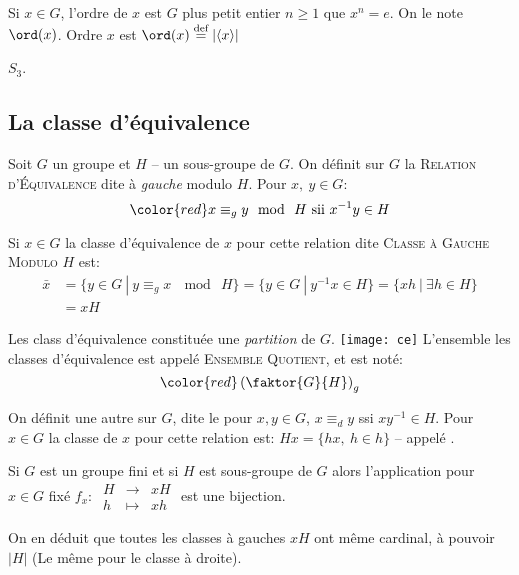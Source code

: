 Si  $x\in G$, l'ordre de $x$ est $G$ plus petit entier $n\geq 1$ que $x^n = e$. On le note $\ord(x)$. Ordre $x$ est $\ord(x)\overset{\text{def}}{=}|\langle x\rangle|$

\begin{exercise}
	$S_3$.
\end{exercise}

\subsection{La classe d'équivalence} 

\begin{definition}
	Soit $G$ un groupe et $H$ -- un sous-groupe de $G$. On définit sur $G$ la \textsc{Relation d'Équivalence} dite à \emph{gauche} modulo $H$. Pour $x,\ y\in G$: 
	\[ \color{red} x\equiv_g y \mod\ H \mbox{ sii } x^{-1}y\in H \]
	\vspace{-8mm}
\end{definition}

Si $x\in G$ la classe d'équivalence de $x$ pour cette relation dite \textsc{Classe à Gauche Modulo $H$} est:
\begin{align*}	
	\bar{x} & =\{y\in G\ |\ y\equiv_g x\  \mod\ H\}=\{y\in G\ |\ y^{-1}x\in H\}=\{x h\ |\ \exists h\in H\}\\
	& =xH
\end{align*} 

\begin{remark}
	Les class d'équivalence constituée une \emph{partition} de $G$.
	\texttt{[image: ce]}
	L'ensemble les classes d'équivalence est appelé \textsc{Ensemble Quotient}, et est noté:
	$$ \color{red}\left(	\faktor{G}{H}	\right)_g$$
\end{remark}

On définit une autre  sur $G$, dite  le pour $x, y\in G$, $x\equiv_dy$ ssi $xy^{-1}\in H$. Pour $x\in G$ la classe de $x$ pour cette relation est: $Hx=\{hx,\ h\in h\}$ -- appelé .

Si $G$ est un groupe fini et si $H$ est sous-groupe de $G$ alors l'application pour $x\in G$ fixé $f_x:\ \begin{array}{rcl}H &\rightarrow & xH\\ h &\mapsto & xh\end{array}$ est une bijection.

On en déduit que toutes les classes à gauches $xH$ ont même cardinal, à pouvoir $|H|$ (Le même pour le classe à droite).

